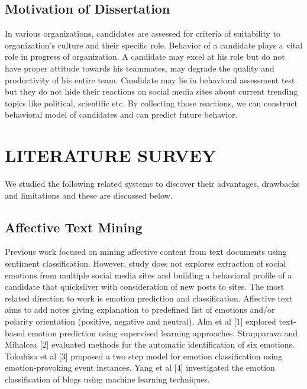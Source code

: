 \documentclass[oneside,a4paper,12pt]{pictreport}
\begin{document}
\section{Motivation of Dissertation}

\hspace{1.1cm} In various organizations, candidates are assessed for criteria of suitability to organization’s culture and their specific role. Behavior of a candidate plays a vital role in progress of organization. A candidate may excel at his role but do not have proper attitude towards his teammates, may degrade the quality and productivity of his entire team. Candidate may lie in behavioral assessment test but they do not hide their reactions on social media sites about current trending topics like political, scientific etc. By collecting those reactions, we can construct behavioral model of candidates and can predict future behavior.
 

\chapter{LITERATURE SURVEY}

We studied the following related systems to discover their advantages, drawbacks and limitations and these are discussed below.

\section{Affective Text Mining}
\hspace{1.1cm}Previous work focused on mining affective content from text documents using sentiment classification. However, study does not explores extraction of social emotions from multiple social media sites and building a behavioral profile of a candidate that quicksilver with consideration of new posts to sites. The most related direction to work is emotion prediction and classification. Affective text aims to add notes giving explanation to predefined list of emotions and/or polarity orientation (positive, negative and neutral). Alm et al [1] explored text-based emotion prediction using supervised learning approaches. Strapparava and Mihalcea [2] evaluated methods for the automatic identification of six emotions. Tokuhisa et al [3] proposed a two step model for emotion classification using emotion-provoking event instances. Yang et al [4] investigated the emotion classification of blogs using machine learning techniques.
\end{document}
